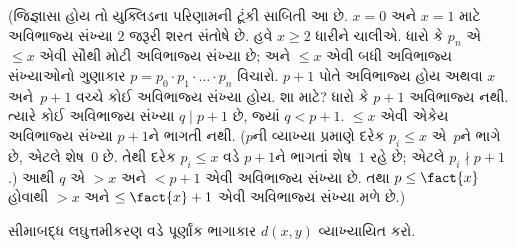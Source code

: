 \documentclass[../../../include/open-logic-section]{subfiles}
\begin{document}
(જિજ્ઞાસા હોય તો યુક્લિડના પરિણામની ટૂંકી સાબિતી આ છે. $x=0$
અને $x=1$ માટે અવિભાજ્ય સંખ્યા $2$ જરૂરી શરત સંતોષે છે. હવે
$x\geq 2$ ધારીને ચાલીએ. ધારો કે
$p_n$ એ $\le x$ એવી સૌથી મોટી અવિભાજ્ય સંખ્યા છે; અને
$\le x$ એવી બધી અવિભાજ્ય સંખ્યાઓનો ગુણાકાર $p =
p_0\cdot p_1 \cdot \dots \cdot p_n$ વિચારો. $p+1$ પોતે અવિભાજ્ય
હોય અથવા $x$ અને~$p+1$ વચ્ચે કોઈ અવિભાજ્ય સંખ્યા હોય. શા માટે?
ધારો કે $p+1$ અવિભાજ્ય નથી. ત્યારે કોઈ અવિભાજ્ય સંખ્યા
$q \mid p+1$ છે, જ્યાં $q < p+1$. $\le x$ એવી એકેય અવિભાજ્ય
સંખ્યા $p+1$ને ભાગતી નથી. ($p$ની વ્યાખ્યા પ્રમાણે દરેક
$p_i \le x$ એ~$p$ને ભાગે છે, એટલે શેષ~$0$ છે. તેથી દરેક
$p_i \le x$ વડે $p+1$ને ભાગતાં શેષ~$1$ રહે છે; એટલે
$p_i \nmid p+1$.) આથી $q$ એ $> x$ અને $< p+1$ એવી અવિભાજ્ય
સંખ્યા છે. તથા $p \le \fact{x}$ હોવાથી $> x$ અને
$\le \fact{x}+1$ એવી અવિભાજ્ય સંખ્યા મળે છે.)

\begin{prob}
સીમાબદ્ધ લઘુત્તમીકરણ વડે પૂર્ણાંક ભાગાકાર $d(x, y)$ વ્યાખ્યાયિત
કરો.
\end{prob}
\end{document}
